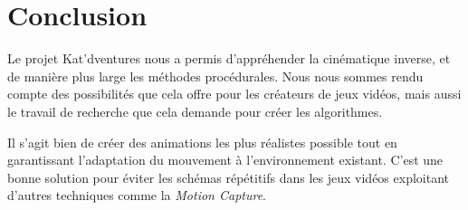 \documentclass[a4paper,11pt]{article}
\begin{document}
%	
%	
%	
%	
%	
%	
%	
%	


\section{Conclusion} 
 
Le projet Kat'dventures nous a permis d'appréhender la cinématique inverse, et de manière plus large les méthodes procédurales. Nous nous sommes rendu compte des possibilités que cela offre pour les créateurs de jeux vidéos, mais aussi le travail de recherche que cela demande pour créer les algorithmes. 

Il s'agit bien de créer des animations les plus réalistes possible tout en garantissant l'adaptation du mouvement à l'environnement existant. C'est une bonne solution pour éviter les schémas répétitifs dans les jeux vidéos exploitant d'autres techniques comme la \textit{Motion Capture}. 


\end{document}
